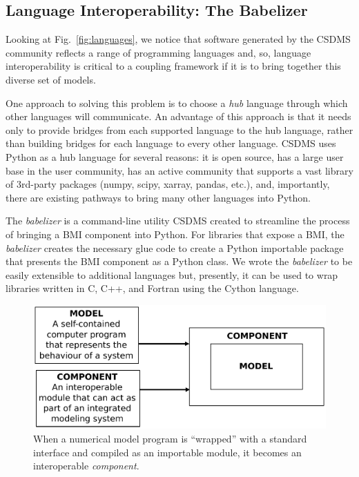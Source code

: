 \documentclass[journal abbreviation, manuscript]{copernicus}
\begin{document}
\subsection{Language Interoperability: The Babelizer}
\label{sec:babelizer}

Looking at Fig.~\ref{fig:languages},
we notice that software generated by the CSDMS community
reflects a range of programming languages and, so, language interoperability is critical
to a coupling framework if it is to bring together this diverse set of models.

One approach to solving this problem is to choose a \textit{hub} language through
which other languages will communicate. An advantage of this approach is that
it needs only to provide bridges from each supported language to the hub
language, rather than building bridges for each language to every
other language. CSDMS uses Python as a hub language for several reasons: it is open source, has a large user
base in the user community, has an active community that supports a vast library
of 3rd-party packages (numpy, scipy, xarray, pandas, etc.), and,
importantly, there are existing pathways to bring many other languages into Python.

The \textit{babelizer} is a command-line utility CSDMS created to streamline the
process of bringing a BMI component into Python. For libraries that expose a
BMI, the \textit{babelizer} creates the necessary glue code to create a Python
importable package that presents the BMI component as a Python class. We
wrote the \textit{babelizer} to be easily extensible to additional languages but,
presently, it can be used to wrap libraries written in C, C++, and Fortran
using the Cython language.








\begin{figure}[h!]
\centering
\includegraphics[scale=0.5]{Figures/fig06.pdf}
\caption{When a numerical model program is ``wrapped'' with a standard interface and compiled as an importable module, it becomes an interoperable \textit{component}.}
\label{fig:component}
\end{figure}
\end{document}
